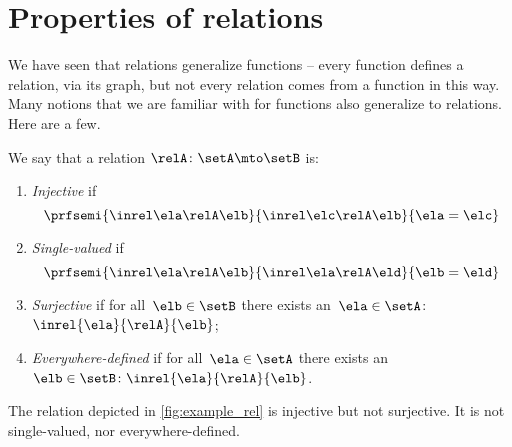 
\section{Properties of relations}

We have seen that relations generalize functions -- every function defines a relation, via its graph, but not every relation comes from a function in this way.
Many notions that we are familiar with for functions also generalize to relations.
Here are a few.

\begin{ctdefinition}
	\label{def:rel_properties}
	We say that a relation  $\relA \colon \setA \mto \setB$ is:
	\begin{enumerate}
		\item \emph{Injective} if
		      \begin{equation}
			      \prfsemi{
				      \inrel \ela \relA \elb
			      }{
				      \inrel \elc \relA \elb
			      }{
				      \ela=\elc
			      }
		      \end{equation}
		\item \emph{Single-valued} if
		      \begin{equation}
			      \prfsemi{
				      \inrel \ela \relA \elb
			      }{
				      \inrel \ela \relA \eld
			      }{
				      \elb = \eld
			      }
		      \end{equation}
		\item \emph{Surjective} if for all~$\elb\in \setB$ there exists an~$\ela\in \setA$:~$\inrel{\ela}{\relA}{\elb}$;
		\item \emph{Everywhere-defined} if for all~$\ela\in \setA$ there exists an ~$\elb \in \setB\colon \inrel{\ela}{\relA}{\elb}$.
	\end{enumerate}
\end{ctdefinition}

\begin{example}
	The relation depicted in \cref{fig:example_rel} is injective but not surjective.
	It is not single-valued, nor everywhere-defined.
\end{example}

